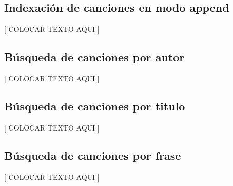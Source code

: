 \documentclass{article}
\begin{document}
\subsection{Indexación de canciones en modo append}

	[ COLOCAR TEXTO AQUI ]
\bigskip



\subsection{Búsqueda de canciones por autor}

	[ COLOCAR TEXTO AQUI ]
\bigskip



\subsection{Búsqueda de canciones por titulo}

	[ COLOCAR TEXTO AQUI ]
\bigskip



\subsection{Búsqueda de canciones por frase}

	[ COLOCAR TEXTO AQUI ]
\bigskip
\end{document}
